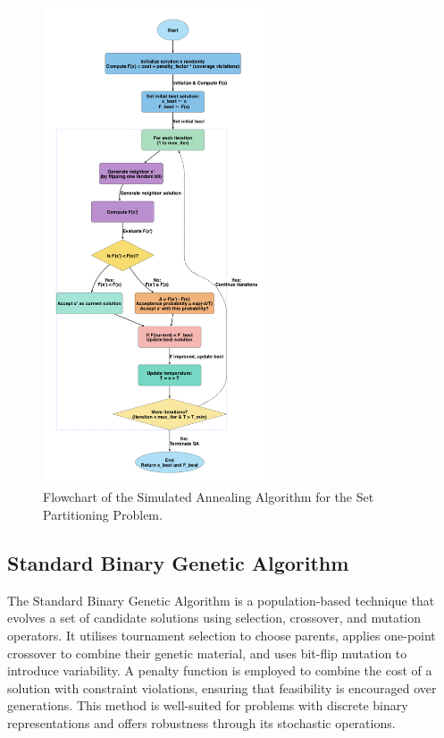 \documentclass[12pt]{article}
\begin{document}
\begin{figure}[htbp]
  \centering
  \includegraphics[width=0.60\textwidth]{images/simulated_annealing_flowchart.png}
  \caption{Flowchart of the Simulated Annealing Algorithm for the Set Partitioning Problem.}
  \label{fig:flowchart1}
\end{figure}

\newpage

\subsection{Standard Binary Genetic Algorithm}
The Standard Binary Genetic Algorithm is a population-based technique that evolves a set of candidate solutions using selection, crossover, and mutation operators. 
It utilises tournament selection to choose parents, applies one-point crossover to combine their genetic material, and uses bit-flip mutation to introduce variability. 
A penalty function is employed to combine the cost of a solution with constraint violations, ensuring that feasibility is encouraged over generations. 
This method is well-suited for problems with discrete binary representations and offers robustness through its stochastic operations.
\end{document}
